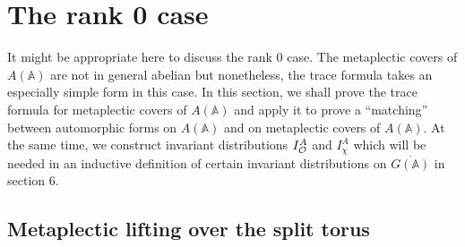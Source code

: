 \section{The rank 0 case}

It might be appropriate here to discuss the rank 0 case. The metaplectic
covers of $A(\mathbb{A})$ are not in general abelian but nonetheless, the
trace formula takes an especially simple form in this case. In this section,
we shall prove the trace formula for metaplectic covers of $A({\mathbb{A}})$ and
apply it to prove a ``matching'' between automorphic forms on $A({\mathbb{A}})$
and on metaplectic covers of $A({\mathbb{A}})$. At the same time, we construct
invariant distributions $I_{\cal{O}}^A$ and $I_\chi ^A$ which will be
needed in an inductive definition of certain invariant distributions
on $\overline{G({\mathbb{A}})}$ in section 6. 

\subsection{Metaplectic lifting over the split torus}

